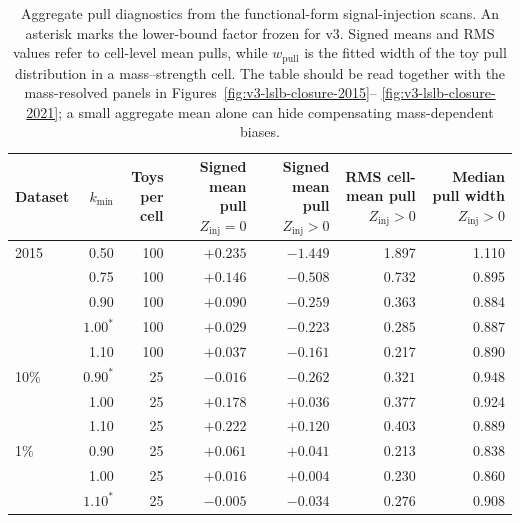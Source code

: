 \begin{table}[H]
\centering
\scriptsize
\begin{tabular}{lrrrrrr}
\toprule
Dataset & $k_{\min}$ & \makecell{Toys\\per cell} &
\makecell{Signed mean pull\\$Z_{\mathrm{inj}}=0$} &
\makecell{Signed mean pull\\$Z_{\mathrm{inj}}>0$} &
\makecell{RMS cell-mean pull\\$Z_{\mathrm{inj}}>0$} &
\makecell{Median pull width\\$Z_{\mathrm{inj}}>0$} \\
\midrule
2015 & 0.50 & 100 & $+0.235$ & $-1.449$ & 1.897 & 1.110 \\
     & 0.75 & 100 & $+0.146$ & $-0.508$ & 0.732 & 0.895 \\
     & 0.90 & 100 & $+0.090$ & $-0.259$ & 0.363 & 0.884 \\
     & $\mathbf{1.00}^{\ast}$ & 100 & $\mathbf{+0.029}$ & $\mathbf{-0.223}$ & $\mathbf{0.285}$ & $\mathbf{0.887}$ \\
     & 1.10 & 100 & $+0.037$ & $-0.161$ & 0.217 & 0.890 \\
\addlinespace
2016 10\% & $\mathbf{0.90}^{\ast}$ & 25 & $\mathbf{-0.016}$ & $\mathbf{-0.262}$ & $\mathbf{0.321}$ & $\mathbf{0.948}$ \\
     & 1.00 & 25 & $+0.178$ & $+0.036$ & 0.377 & 0.924 \\
     & 1.10 & 25 & $+0.222$ & $+0.120$ & 0.403 & 0.889 \\
\addlinespace
2021 1\% & 0.90 & 25 & $+0.061$ & $+0.041$ & 0.213 & 0.838 \\
     & 1.00 & 25 & $+0.016$ & $+0.004$ & 0.230 & 0.860 \\
     & $\mathbf{1.10}^{\ast}$ & 25 & $\mathbf{-0.005}$ & $\mathbf{-0.034}$ & $\mathbf{0.276}$ & $\mathbf{0.908}$ \\
\bottomrule
\end{tabular}
\caption{Aggregate pull diagnostics from the functional-form signal-injection scans.
An asterisk marks the lower-bound factor frozen for v3. Signed means and RMS values
refer to cell-level mean pulls, while $w_{\mathrm{pull}}$ is the fitted width of the
toy pull distribution in a mass--strength cell. The table should be read together with
the mass-resolved panels in Figures~\ref{fig:v3-lslb-closure-2015}--%
\ref{fig:v3-lslb-closure-2021}; a small aggregate mean alone can hide compensating
mass-dependent biases.}
\label{tab:lslb-injection-pull-summary}
\end{table}

